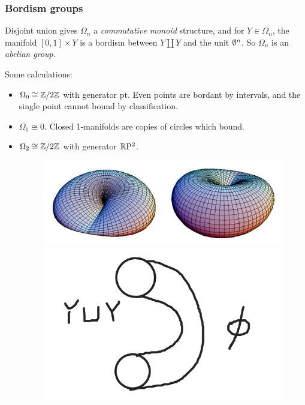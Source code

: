 \documentclass[xcolor=dvipsnames]{beamer}
\begin{document}
    \begin{frame}
        \frametitle{Bordism groups} 
        Disjoint union gives $\Omega_n $ a \emph{commutative monoid}  structure, and for  $Y \in \Omega_n $, the manifold $[0,1] \times Y$ is a bordism between $Y\amalg Y$ and the unit $\emptyset^n $. So $\Omega_n $ is an \emph{abelian group}. 
        \begin{example}
           Some calculations:
           \begin{itemize}
               \item $\Omega_0 \cong \mathbb{Z} /2 \mathbb{Z}$ with generator $\mathrm{pt}$. Even points are bordant by intervals, and the single point cannot bound by classification.
               \item $\Omega_1 \cong 0$. Closed 1-manifolds are copies of circles which bound.
               \item $\Omega_2 \cong \mathbb{Z}/2\mathbb{Z}$ with generator $\mathbb{R} \mathrm P^2$. 
\begin{figure}[H]
\centering
\begin{minipage}[b]{0.5\linewidth} 
 \includegraphics[width=0.8\linewidth]{figures/rp2.PNG}
\end{minipage}
\begin{minipage}[b]{0.4\linewidth} 
 \includegraphics[width=0.7\linewidth]{figures/group.png}
\end{minipage}
\end{figure}
           \end{itemize}
        \end{example}
    \end{frame}
\end{document}
